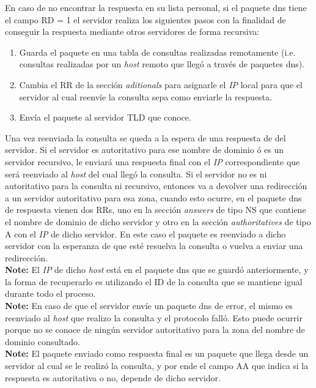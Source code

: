 \documentclass[10pt,a4paper]{article}
\begin{document}
En caso de no encontrar la respuesta en su lista personal, si el paquete dns tiene el campo RD = 1 el servidor realiza los siguientes pasos con la finalidad de conseguir la respuesta mediante otros servidores de forma recursiva:

\begin{enumerate}
\item Guarda el paquete en una tabla de consultas realizadas remotamente (i.e. consultas realizadas por un \textit{host} remoto que llegó a través de paquetes dns).
\item Cambia el RR de la sección \textit{aditionals} para asignarle el \textit{IP} local para que el servidor al cual reenvíe la consulta sepa como enviarle la respuesta.
\item Envía el paquete al servidor TLD que conoce.
\end{enumerate}

Una vez reenviada la consulta se queda a la espera de una respuesta de del servidor. Si el servidor es autoritativo para ese nombre de dominio ó es un servidor recursivo, le enviará una respuesta final con el \textit{IP} correspondiente que será reenviado al \textit{host} del cual llegó la consulta. Si el servidor no es ni autoritativo para la consulta ni recursivo, entonces va a devolver una redirección a un servidor autoritativo para esa zona, cuando esto ocurre, en el paquete dns de respuesta vienen dos RRs, uno en la sección \textit{answers} de tipo NS que contiene el nombre de dominio de dicho servidor y otro en la sección \textit{authoritatives} de tipo A con el \textit{IP} de dicho servidor. En este caso el paquete es reenviado a dicho servidor con la esperanza de que esté resuelva la consulta o vuelva a enviar una redirección. \\

\textbf{Note:} El \textit{IP} de dicho \textit{host} está en el paquete dns que se guardó anteriormente, y la forma de recuperarlo es utilizando el ID de la consulta que se mantiene igual durante todo el proceso. \\

\textbf{Note:} En caso de que el servidor envíe un paquete dns de error, el mismo es reenviado al \textit{host} que realizo la consulta y el protocolo falló. Esto puede ocurrir porque no se conoce de ningún servidor autoritativo para la zona del nombre de dominio consultado. \\

\textbf{Note:} El paquete enviado como respuesta final es un paquete que llega desde un servidor al cual se le realizó la consulta, y por ende el campo AA que indica si la respuesta es autoritativa o no, depende de dicho servidor. \\
\end{document}
